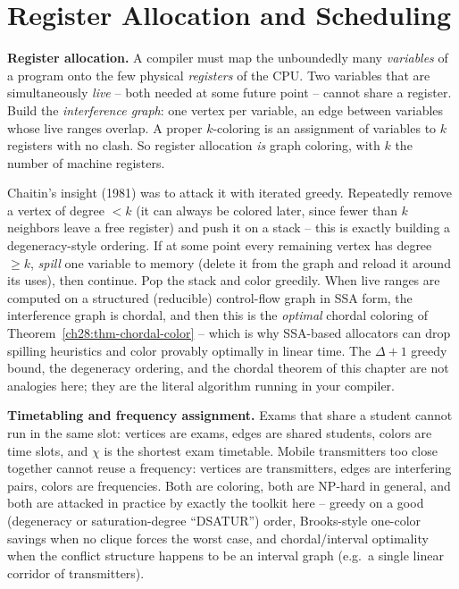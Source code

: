 \section{Register Allocation and Scheduling}
\label{ch28:applications}

\begin{applicationbox}
\textbf{Register allocation.} A compiler must map the unboundedly many
\emph{variables} of a program onto the few physical \emph{registers} of the CPU.
Two variables that are simultaneously \emph{live} -- both needed at some future
point -- cannot share a register. Build the \emph{interference graph}: one vertex
per variable, an edge between variables whose live ranges overlap. A proper
$k$-coloring is an assignment of variables to $k$ registers with no clash. So
register allocation \emph{is} graph coloring, with $k$ the number of machine
registers.

Chaitin's insight (1981) was to attack it with iterated greedy. Repeatedly remove a
vertex of degree $<k$ (it can always be colored later, since fewer than $k$
neighbors leave a free register) and push it on a stack -- this is exactly building
a degeneracy-style ordering. If at some point every remaining vertex has degree
$\ge k$, \emph{spill} one variable to memory (delete it from the graph and reload it
around its uses), then continue. Pop the stack and color greedily. When live ranges
are computed on a structured (reducible) control-flow graph in SSA form, the
interference graph is chordal, and then this is the \emph{optimal} chordal coloring
of Theorem~\ref{ch28:thm-chordal-color} -- which is why SSA-based allocators can drop
spilling heuristics and color provably optimally in linear time. The $\Delta+1$
greedy bound, the degeneracy ordering, and the chordal theorem of this chapter are
not analogies here; they are the literal algorithm running in your compiler.
\end{applicationbox}

\begin{applicationbox}
\textbf{Timetabling and frequency assignment.} Exams that share a student cannot run
in the same slot: vertices are exams, edges are shared students, colors are time
slots, and $\chi$ is the shortest exam timetable. Mobile transmitters too close
together cannot reuse a frequency: vertices are transmitters, edges are interfering
pairs, colors are frequencies. Both are coloring, both are NP-hard in general, and
both are attacked in practice by exactly the toolkit here -- greedy on a good
(degeneracy or saturation-degree ``DSATUR'') order, Brooks-style one-color savings
when no clique forces the worst case, and chordal/interval optimality when the
conflict structure happens to be an interval graph (e.g.\ a single linear corridor
of transmitters).
\end{applicationbox}

